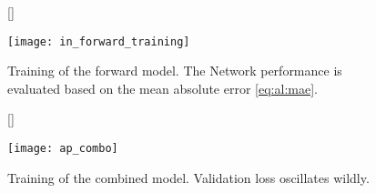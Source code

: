 \begin{figure}[H]
    [\FBwidth]
    {\caption{
        Training of the forward model. The Network performance is evaluated based on the mean absolute error \ref{eq:al:mae}.
    }
    \label{fig:in:forward_training}}
    {\texttt{[image: in\_forward\_training]}}
\end{figure}

\begin{figure}[H]
    [\FBwidth]
    {\caption{
        Training of the combined model. Validation loss oscillates wildly.
    }
    \label{fig:ap:combined_training}}
    {\texttt{[image: ap\_combo]}}
\end{figure}
